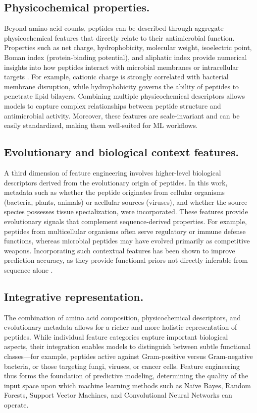 \documentclass[a4paper,twoside,12pt]{book}
\begin{document}
\subsection{Physicochemical properties.}
Beyond amino acid counts, peptides can be described through aggregate physicochemical features that directly relate to their antimicrobial function. Properties such as net charge, hydrophobicity, molecular weight, isoelectric point, Boman index (protein-binding potential), and aliphatic index provide numerical insights into how peptides interact with microbial membranes or intracellular targets \cite{bib:agrawal2020}. For example, cationic charge is strongly correlated with bacterial membrane disruption, while hydrophobicity governs the ability of peptides to penetrate lipid bilayers. Combining multiple physicochemical descriptors allows models to capture complex relationships between peptide structure and antimicrobial activity. Moreover, these features are scale-invariant and can be easily standardized, making them well-suited for ML workflows.

\subsection{Evolutionary and biological context features.}
A third dimension of feature engineering involves higher-level biological descriptors derived from the evolutionary origin of peptides. In this work, metadata such as whether the peptide originates from cellular organisms (bacteria, plants, animals) or acellular sources (viruses), and whether the source species possesses tissue specialization, were incorporated. These features provide evolutionary signals that complement sequence-derived properties. For example, peptides from multicellular organisms often serve regulatory or immune defense functions, whereas microbial peptides may have evolved primarily as competitive weapons. Incorporating such contextual features has been shown to improve prediction accuracy, as they provide functional priors not directly inferable from sequence alone \cite{bib:meher2017}\cite{bib:dziuba2022}.

\subsection{Integrative representation.}
The combination of amino acid composition, physicochemical descriptors, and evolutionary metadata allows for a richer and more holistic representation of peptides. While individual feature categories capture important biological aspects, their integration enables models to distinguish between subtle functional classes—for example, peptides active against Gram-positive versus Gram-negative bacteria, or those targeting fungi, viruses, or cancer cells. Feature engineering thus forms the foundation of predictive modeling, determining the quality of the input space upon which machine learning methods such as Naïve Bayes, Random Forests, Support Vector Machines, and Convolutional Neural Networks can operate.
\end{document}
